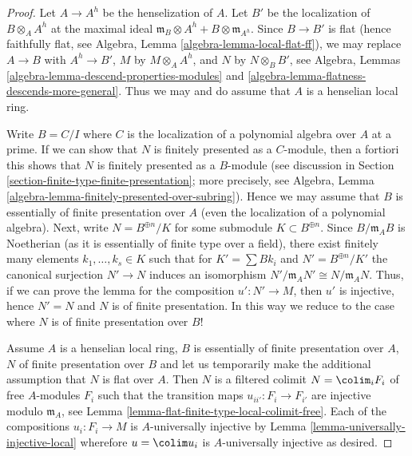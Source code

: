\begin{proof}
Let $A \to A^h$ be the henselization of $A$. Let $B'$ be the localization
of $B \otimes_A A^h$ at the maximal ideal
$\mathfrak m_B \otimes A^h + B \otimes \mathfrak m_{A^h}$.
Since $B \to B'$ is flat (hence faithfully flat, see
Algebra, Lemma \ref{algebra-lemma-local-flat-ff}),
we may replace $A \to B$ with $A^h \to B'$,
$M$ by $M \otimes_A A^h$, and $N$ by $N \otimes_B B'$, see
Algebra, Lemmas \ref{algebra-lemma-descend-properties-modules} and
\ref{algebra-lemma-flatness-descends-more-general}.
Thus we may and do assume that $A$ is a henselian local ring.

\medskip\noindent
Write $B = C/I$ where $C$ is the localization of a polynomial algebra
over $A$ at a prime. If we can show that $N$ is finitely presented as
a $C$-module, then a fortiori this shows that $N$ is finitely presented
as a $B$-module (see discussion in
Section \ref{section-finite-type-finite-presentation};
more precisely, see
Algebra, Lemma \ref{algebra-lemma-finitely-presented-over-subring}).
Hence we may assume that $B$ is essentially of finite
presentation over $A$ (even the localization of a polynomial algebra).
Next, write $N = B^{\oplus n}/K$ for some submodule $K \subset B^{\oplus n}$.
Since $B/\mathfrak m_AB$ is Noetherian (as it is essentially of finite type
over a field), there exist finitely many elements
$k_1, \ldots, k_s \in K$ such that for $K' = \sum Bk_i$
and $N' = B^{\oplus n}/K'$ the canonical surjection
$N' \to N$ induces an isomorphism $N'/\mathfrak m_AN' \cong N/\mathfrak m_AN$.
Thus, if we can prove the lemma for the composition $u' : N' \to M$,
then $u'$ is injective, hence $N' = N$ and $N$ is of finite presentation.
In this way we reduce to the case where $N$ is of finite presentation
over $B$!

\medskip\noindent
Assume $A$ is a henselian local ring, $B$ is essentially
of finite presentation over $A$, $N$ of finite presentation over $B$ and
let us temporarily make the additional assumption that $N$ is flat over $A$.
Then $N$ is a filtered colimit $N = \colim_i F_i$
of free $A$-modules $F_i$ such that the transition maps
$u_{ii'} : F_i \to F_{i'}$ are injective modulo $\mathfrak m_A$, see
Lemma \ref{lemma-flat-finite-type-local-colimit-free}.
Each of the compositions $u_i : F_i \to M$ is $A$-universally
injective by
Lemma \ref{lemma-universally-injective-local}
wherefore $u = \colim u_i$ is $A$-universally injective as desired.


\end{proof}
